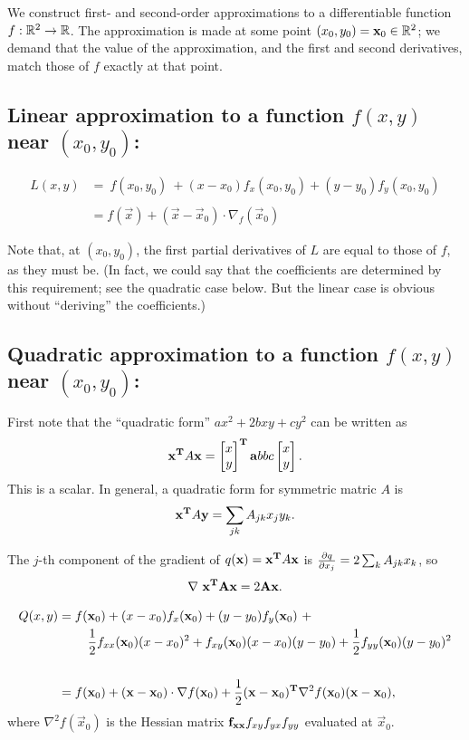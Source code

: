 We construct first- and second-order approximations to a differentiable
function $f: \mathbb{R}^2 \rightarrow \mathbb{R}$. The approximation is made at some point
$(x_0, y_0) = \mathbf x_0 \in \mathbb{R}^2$; we demand that the value of the approximation, and the
first and second derivatives, match those of $f$ exactly at that point.

\subsection{Linear approximation to a function $f(x, y)$ near $(x_0, y_0)$:}

\begin{align*}
L(x, y) &=
~
f(x_0, y_0) ~+
(x - x_0)f_x(x_0,y_0) +
(y - y_0)f_y(x_0,y_0)
\\\\
&= f(\vec x) + (\vec x - \vec x_0) \cdot \nabla_f(\vec x_0)
\end{align*}

Note that, at $(x_0, y_0)$, the first partial derivatives of $L$ are equal to
those of $f$, as they must be. (In fact, we could say that the coefficients are
determined by this requirement; see the quadratic case below. But the linear
case is obvious without ``deriving'' the coefficients.)


\subsection{Quadratic approximation to a function $f(x, y)$ near $(x_0, y_0)$:}

First note that the ``quadratic form'' $ax^2 + 2bxy + cy^2$ can be written as
\begin{align*}
\mathbf x^{\mathbf{T}} A \mathbf x = \begin{bmatrix}x\\y\end{bmatrix}^{\mathbf{T}} \mathbf{a}{b}
                                {b}{c} \begin{bmatrix}x\\y\end{bmatrix}.
\end{align*}
This is a scalar. In general, a quadratic form for symmetric matric $A$ is
\begin{align*}
\mathbf x^{\mathbf{T}} A \mathbf y = \sum_{jk}A_{jk}x_jy_k.
\end{align*}

The $j$-th component of the gradient of $q(\mathbf x) = \mathbf x^{\mathbf{T}} A \mathbf x$ is
$\frac{\partial q}{\partial x_j} = 2\sum_k A_{jk}x_k$, so
\begin{align*}
  \nabla ~\mathbf x^{\mathbf{T}} \mathbf A \mathbf x = 2\mathbf A \mathbf x.
\end{align*}

\begin{align*}
Q(x, y) &=
f(\mathbf x_0) + (x - x_0)f_x(\mathbf x_0) +
(y - y_0)f_y(\mathbf x_0) ~+ \\
&~~~~~~~\frac{1}{2} f_{xx}(\mathbf x_0)(x - x_0)^2 +
f_{xy}(\mathbf x_0)(x - x_0)(y - y_0) +
\frac{1}{2} f_{yy}(\mathbf x_0)(y - y_0)^2 \\\\
&= f(\mathbf x_0) +
(\mathbf x - \mathbf x_0) \cdot \nabla f(\mathbf x_0) +
\frac{1}{2}(\mathbf x - \mathbf x_0)^{\mathbf{T}} \nabla^2 f(\mathbf x_0)(\mathbf x - \mathbf x_0),
\end{align*}
where $\nabla^2 f(\vec x_0)$ is the Hessian matrix $\mathbf{f_{xx}}{f_{xy}}
                                                        {f_{yx}}{f_{yy}}$ evaluated at $\vec x_0$.

